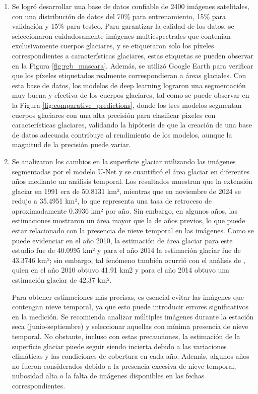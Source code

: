\begin{enumerate}
	\item Se logró desarrollar una base de datos confiable de 2400 imágenes satelitales, con una distribución de datos del 70\% para entrenamiento, 15\% para validación y 15\% para testeo. Para garantizar la calidad de los datos, se seleccionaron cuidadosamente imágenes multiespectrales que contenían exclusivamente cuerpos glaciares, y se etiquetaron solo los píxeles correspondientes a características glaciares, estas etiquetas se pueden observar en la Figura \ref{fig:rgb_mascara}. Además, se utilizó Google Earth para verificar que los píxeles etiquetados realmente correspondieran a áreas glaciales. Con esta base de datos, los modelos de deep learning lograron una segmentación muy buena y efectiva de los cuerpos glaciares, tal como se puede observar en la Figura \ref{fig:comparative_predictions}, donde los tres modelos segmentan cuerpos glaciares con una alta precisión para clasificar pixeles con características glaciares, validando la hipótesis de que la creación de una base de datos adecuada contribuye al rendimiento de los modelos, aunque la magnitud de la precisión puede variar.
	
	\item Se analizaron los cambios en la superficie glaciar utilizando las imágenes segmentadas por el modelo U-Net y se cuantificó el área glaciar en diferentes años mediante un análisis temporal. Los resultados muestran que la extensión glaciar en 1991 era de 50.8131 km², mientras que en noviembre de 2024 se redujo a 35.4951 km², lo que representa una tasa de retroceso de aproximadamente 0.3936 km² por año. Sin embargo, en algunos años, las estimaciones mostraron un área mayor que la de años previos, lo que puede estar relacionado con la presencia de nieve temporal en las imágenes. Como se puede evidenciar en el año 2010, la estimación de área glaciar para este estudio fue de 40.0995 km² y para el año 2014 la estimación glaciar fue de 43.3746 km²; sin embargo, tal fenómeno también ocurrió con el análisis de \parencite{malone2022evolution}, quien en el año 2010 obtuvo 41.91 km2 y para el año 2014 obtuvo una estimación glaciar de 42.37 km².
	
	Para obtener estimaciones más precisas, es esencial evitar las imágenes que contengan nieve temporal, ya que esto puede introducir errores significativos en la medición. Se recomienda analizar múltiples imágenes durante la estación seca (junio-septiembre) y seleccionar aquellas con mínima presencia de nieve temporal. No obstante, incluso con estas precauciones, la estimación de la superficie glaciar puede seguir siendo incierta debido a las variaciones climáticas y las condiciones de cobertura en cada año. Además, algunos años no fueron considerados debido a la presencia excesiva de nieve temporal, nubosidad alta o la falta de imágenes disponibles en las fechas correspondientes.
	

\end{enumerate}
